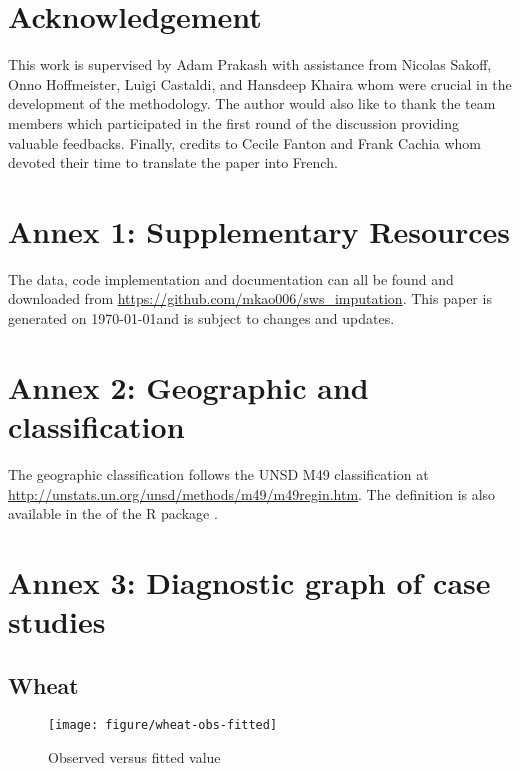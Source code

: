 \documentclass[nojss]{jss}\usepackage[]{graphicx}\usepackage[]{color}
\makeatletter
\def\maxwidth{ %
  \ifdim\Gin@nat@width>\linewidth
    \linewidth
  \else
    \Gin@nat@width
  \fi
}
\newenvironment{knitrout}{}{} %
\makeatother
\begin{document}
\section*{Acknowledgement}
This work is supervised by Adam Prakash with assistance from Nicolas
Sakoff, Onno Hoffmeister, Luigi Castaldi, and Hansdeep Khaira whom
were crucial in the development of the methodology. The author would
also like to thank the team members which participated in the first
round of the discussion providing valuable feedbacks. Finally, credits
to Cecile Fanton and Frank Cachia whom devoted their time to translate
the paper into French.

\section*{Annex 1: Supplementary Resources}

The data, code implementation and documentation can all be found and
downloaded from \url{https://github.com/mkao006/sws_imputation}. This
paper is generated on \today and is subject to changes and updates.


\section*{Annex 2: Geographic and classification}

The geographic classification follows the UNSD M49 classification at
\url{http://unstats.un.org/unsd/methods/m49/m49regin.htm}. The
definition is also available in the  of the R
package .



\section*{Annex 3: Diagnostic graph of case studies}
\subsection*{Wheat}
\begin{knitrout}
\color{fgcolor}\begin{figure}[!ht]


{\centering \texttt{[image: figure/wheat-obs-fitted]} 

}

\caption[Observed versus fitted value]{Observed versus fitted value\label{fig:wheat-obs-fitted}}
\end{figure}


\end{knitrout}
\end{document}

